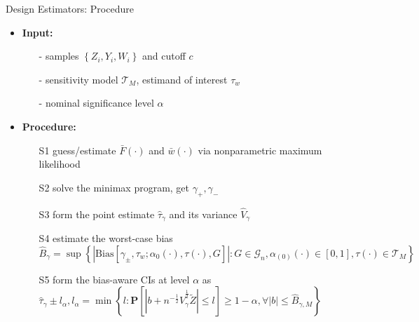 \begin{frame}{Design Estimators: Procedure}

    \begin{itemize}
        \item<1-> \textcolor{mygreen}{\textbf{Input:}}
        \begin{itemize}
            \item[-] samples $ \left\{ Z_{i},Y_{i},W_{i}\right\} $ and cutoff $c$
            \item[-] sensitivity model $\mathcal{T}_{M}$, estimand of interest $\tau_{w}$
            \item[-] nominal significance level $\alpha$ 
        \end{itemize}

        \item<2-> \textcolor{mygreen}{\textbf{Procedure:}}
        \begin{itemize}
            \item[S1] guess/estimate $\bar{F}\left(\cdot\right)$ and $\bar{w}\left(\cdot\right)$ via nonparametric maximum likelihood
            \item[S2] solve the minimax program, get $\gamma_{+},\gamma_{-}$ 
            \item[S3] form the point estimate $\hat{\tau}_{\gamma}$ and its variance $\hat{V}_{\gamma}$
            \item[S4] estimate the worst-case bias $\hat{B}_{\gamma}=\sup\left\{ \left|\mathrm{Bias}\left[\gamma_{\pm},\tau_{w};\alpha_{0}\left(\cdot\right),\tau\left(\cdot\right),G\right]\right|:G\in\mathcal{G}_{n},\alpha_{\left(0\right)}\left(\cdot\right)\in\left[0,1\right],\tau\left(\cdot\right)\in\mathcal{T}_{M}\right\} $
            \item[S5] form the bias-aware CIs at level $\alpha$ as $\hat{\tau}_{\gamma}\pm l_{\alpha},l_{\alpha}=\min\left\{ l:\mathbf{P}\left[\left|b+n^{-\frac{1}{2}}\hat{V}_{\gamma}^{\frac{1}{2}}\tilde{Z}\right|\leq l\right]\geq1-\alpha,\forall\left|b\right|\leq\hat{B}_{\gamma,M}\right\} $
        \end{itemize}
    \end{itemize}
    
\end{frame}
